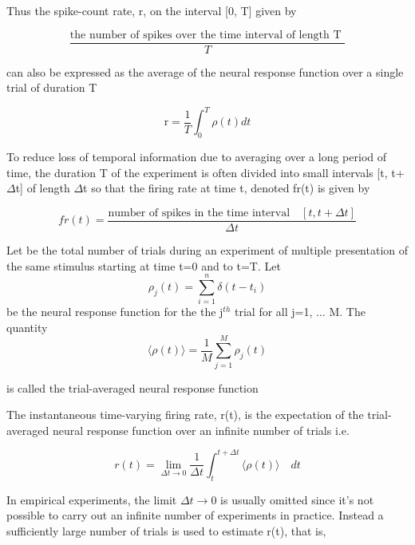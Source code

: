 Thus the spike-count rate, r,  on the interval [0, T]  given by

\[ \dfrac{\text{the number of spikes over the time interval of length T }}{T} \]

can also be expressed as the average of the neural response function
over a single trial of duration T

\begin{equation}\label{spike-count rate}
  \text{r} =  \frac{1}{T}  \int_{0}^{T}  \rho(t)  dt
\end{equation}

To reduce loss of temporal information due to averaging over a long period of time, the duration T of the experiment is often divided into small intervals [t, t+$\Delta$t] of length $\Delta$t so that the firing rate at time t,
denoted fr(t)  is  given by

\begin{equation}\label{single-trial emprical-spike count}
fr(t) = \dfrac{\text{number of spikes in the time interval} \quad [t, t+\Delta t]}
{\Delta t}
\end{equation}


\begin{Def}\label{trial-average neural response}
Let  be the total number of trials during an experiment
of multiple presentation of the same stimulus starting at time t=0 and to t=T. 
Let \[ \rho_{j}(t) = \displaystyle \sum_{i=1}^{n} \delta(t-t_{i})\] 
be the neural response function for the the j$^{th}$ trial for all j=1, $\dots$ M. The quantity 
\[ \langle \rho(t) \rangle  = 
\displaystyle  \frac{1}{M} \sum_{j=1}^{M} \rho_{j}(t)\] 

is called the trial-averaged neural response function

\end{Def}

The instantaneous time-varying firing rate, r(t), is the expectation of the 
trial-averaged neural response function over an infinite number of trials i.e.

\begin{equation} \label{expected FireRate}
r(t) = \displaystyle  \lim_{\Delta t \rightarrow 0}    \frac{1}{\Delta t}  \int_{t}^{t+\Delta t} 
 \langle \rho(t) \rangle \quad dt 
\end{equation}


In empirical experiments, the limit ${\Delta t \rightarrow 0}$ is usually
omitted since it's not possible to carry out an infinite number of experiments
in practice. Instead a sufficiently large number of trials is used
to estimate r(t), that is,

